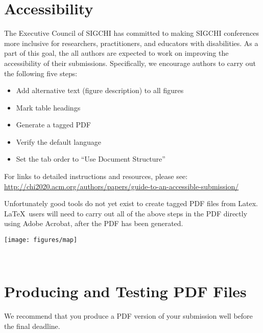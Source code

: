 \section{Accessibility}
The Executive Council of SIGCHI has committed to making SIGCHI
conferences more inclusive for researchers, practitioners, and
educators with disabilities. As a part of this goal, the all authors
are expected to work on improving the accessibility of their
submissions. Specifically, we encourage authors to carry out the
following five steps:
\begin{itemize}\compresslist%
\item Add alternative text (figure description) to all figures
\item Mark table headings
\item Generate a tagged PDF
\item Verify the default language
\item Set the tab order to ``Use Document Structure''
\end{itemize}

For links to detailed instructions and resources, please see:
\url{http://chi2020.acm.org/authors/papers/guide-to-an-accessible-submission/}

Unfortunately good tools do not yet exist to create tagged PDF files
from Latex. \LaTeX\ users will need to carry out all of the above
steps in the PDF directly using Adobe Acrobat, after the PDF has been
generated.


\begin{figure*}
  \centering
  \texttt{[image: figures/map]}
  \caption{In this image, the map maximizes use of space. You can make
    figures as wide as you need, up to a maximum of the full width of
    both columns. Note that \LaTeX\ tends to render large figures on a
    dedicated page. Image: \ccbynd~ayman on Flickr.}~\label{fig:cats}
\end{figure*}

\section{Producing and Testing PDF Files}
We recommend that you produce a PDF version of your submission well
before the final deadline.



